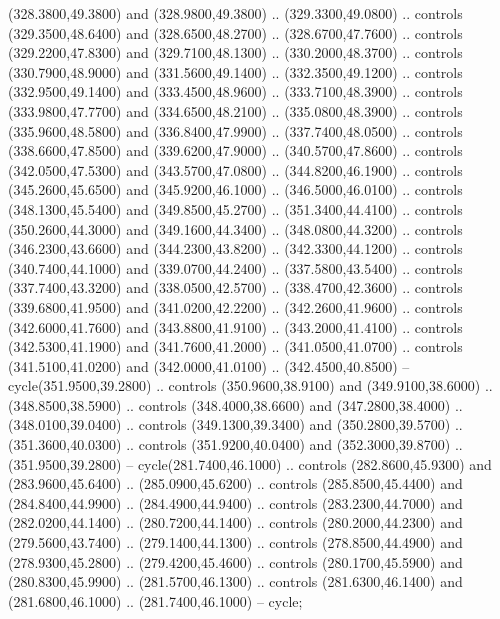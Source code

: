 {\begin{scope}[y=0.80pt, x=0.80pt, yscale=-1, xscale=1, inner sep=0pt, outer sep=0pt, #1]
      (328.3800,49.3800) and (328.9800,49.3800) .. (329.3300,49.0800) .. controls
      (329.3500,48.6400) and (328.6500,48.2700) .. (328.6700,47.7600) .. controls
      (329.2200,47.8300) and (329.7100,48.1300) .. (330.2000,48.3700) .. controls
      (330.7900,48.9000) and (331.5600,49.1400) .. (332.3500,49.1200) .. controls
      (332.9500,49.1400) and (333.4500,48.9600) .. (333.7100,48.3900) .. controls
      (333.9800,47.7700) and (334.6500,48.2100) .. (335.0800,48.3900) .. controls
      (335.9600,48.5800) and (336.8400,47.9900) .. (337.7400,48.0500) .. controls
      (338.6600,47.8500) and (339.6200,47.9000) .. (340.5700,47.8600) .. controls
      (342.0500,47.5300) and (343.5700,47.0800) .. (344.8200,46.1900) .. controls
      (345.2600,45.6500) and (345.9200,46.1000) .. (346.5000,46.0100) .. controls
      (348.1300,45.5400) and (349.8500,45.2700) .. (351.3400,44.4100) .. controls
      (350.2600,44.3000) and (349.1600,44.3400) .. (348.0800,44.3200) .. controls
      (346.2300,43.6600) and (344.2300,43.8200) .. (342.3300,44.1200) .. controls
      (340.7400,44.1000) and (339.0700,44.2400) .. (337.5800,43.5400) .. controls
      (337.7400,43.3200) and (338.0500,42.5700) .. (338.4700,42.3600) .. controls
      (339.6800,41.9500) and (341.0200,42.2200) .. (342.2600,41.9600) .. controls
      (342.6000,41.7600) and (343.8800,41.9100) .. (343.2000,41.4100) .. controls
      (342.5300,41.1900) and (341.7600,41.2000) .. (341.0500,41.0700) .. controls
      (341.5100,41.0200) and (342.0000,41.0100) .. (342.4500,40.8500) --
      cycle(351.9500,39.2800) .. controls (350.9600,38.9100) and (349.9100,38.6000)
      .. (348.8500,38.5900) .. controls (348.4000,38.6600) and (347.2800,38.4000) ..
      (348.0100,39.0400) .. controls (349.1300,39.3400) and (350.2800,39.5700) ..
      (351.3600,40.0300) .. controls (351.9200,40.0400) and (352.3000,39.8700) ..
      (351.9500,39.2800) -- cycle(281.7400,46.1000) .. controls (282.8600,45.9300)
      and (283.9600,45.6400) .. (285.0900,45.6200) .. controls (285.8500,45.4400)
      and (284.8400,44.9900) .. (284.4900,44.9400) .. controls (283.2300,44.7000)
      and (282.0200,44.1400) .. (280.7200,44.1400) .. controls (280.2000,44.2300)
      and (279.5600,43.7400) .. (279.1400,44.1300) .. controls (278.8500,44.4900)
      and (278.9300,45.2800) .. (279.4200,45.4600) .. controls (280.1700,45.5900)
      and (280.8300,45.9900) .. (281.5700,46.1300) .. controls (281.6300,46.1400)
      and (281.6800,46.1000) .. (281.7400,46.1000) -- cycle;


\end{scope}}
